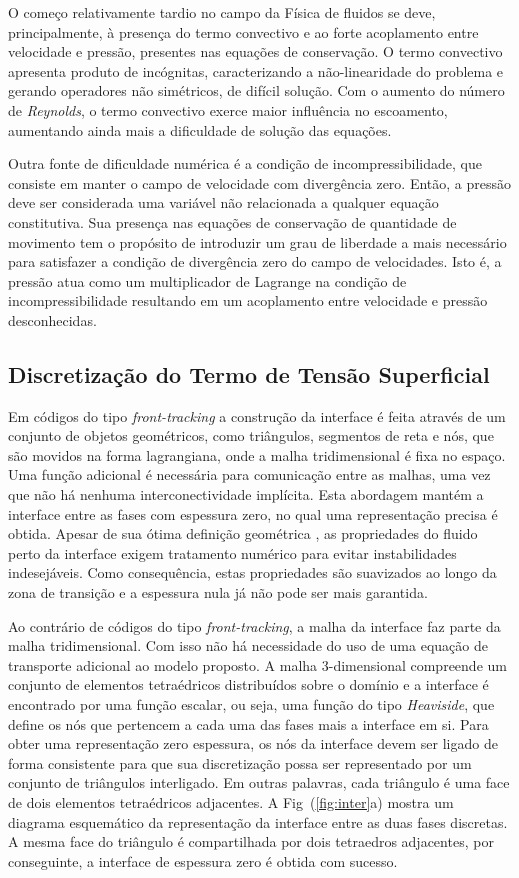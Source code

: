 \documentclass[a4paper,portuges,12pt]{article}
\begin{document}
O começo relativamente tardio no campo da Física de fluidos se deve,
principalmente, à presença do termo convectivo e ao forte acoplamento
entre velocidade e pressão, presentes nas equações de conservação. O
termo convectivo apresenta produto de incógnitas, caracterizando a
não-linearidade do problema e gerando operadores não simétricos, de
difícil solução.  Com o aumento do número de \emph{Reynolds}, o termo
convectivo exerce maior influência no escoamento, aumentando ainda mais
a dificuldade de solução das equações.

Outra fonte de dificuldade numérica é a condição de incompressibilidade,
que consiste em manter o campo de velocidade com divergência zero.
Então, a pressão deve ser considerada uma variável não relacionada a
qualquer equação constitutiva.  Sua presença nas equações de conservação
de quantidade de movimento tem o propósito de introduzir um grau de
liberdade a mais necessário para satisfazer a condição de divergência
zero do campo de velocidades.  Isto é, a pressão atua como um
multiplicador de Lagrange na condição de incompressibilidade resultando
em um acoplamento entre velocidade e pressão desconhecidas.

\subsection{Discretização do Termo de Tensão Superficial}

Em códigos do tipo \textit{front-tracking} a construção da interface é feita
através de um conjunto de objetos geométricos, como triângulos,
segmentos de reta e nós, que são movidos na forma lagrangiana, onde a
malha tridimensional é fixa no espaço. Uma função adicional é necessária
para comunicação entre as malhas, uma vez que não há nenhuma
interconectividade implícita. Esta abordagem mantém a interface entre as
fases com espessura zero, no qual uma representação precisa é obtida.
Apesar de sua ótima definição geométrica , as propriedades do fluido
perto da interface exigem tratamento numérico para evitar instabilidades
indesejáveis. Como consequência, estas propriedades são suavizados ao
longo da zona de transição e a espessura nula já não pode ser mais
garantida.

Ao contrário de códigos do tipo \textit{front-tracking}, a malha da interface
faz parte da malha tridimensional. Com isso não há necessidade do uso de
uma equação de transporte adicional ao modelo proposto. A malha
3-dimensional compreende um conjunto de elementos tetraédricos
distribuídos sobre o domínio e a interface é encontrado por uma função
escalar, ou seja, uma função do tipo \textit{Heaviside}, que define os nós que
pertencem a cada uma das fases mais a interface em si. Para obter uma
representação zero espessura, os nós da interface devem ser ligado de
forma consistente para que sua discretização possa ser representado por
um conjunto de triângulos interligado. Em outras palavras, cada
triângulo é uma face de dois elementos tetraédricos adjacentes. A
Fig~(\ref{fig:inter}a) mostra um diagrama esquemático da
representação da interface entre as duas fases discretas. A mesma face
do triângulo é compartilhada por dois tetraedros adjacentes, por
conseguinte, a interface de espessura zero é obtida com sucesso.
\end{document}
